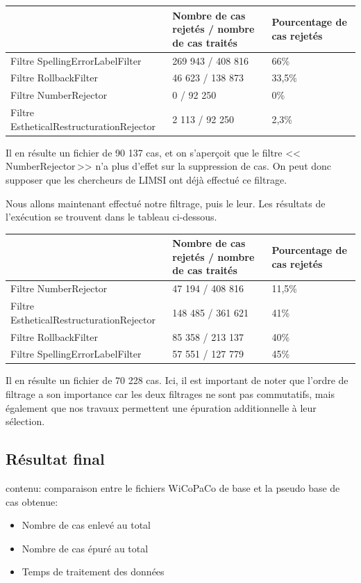 \documentclass[11pt]{article}
\begin{document}
\begin{center}
\begin{tabular}{|M{6cm}|M{5cm}|M{6cm}|}
   \hline
    \, &Nombre de cas rejet\'{e}s / nombre de cas trait\'{e}s & Pourcentage de cas rejet\'{e}s \tabularnewline
    \hline
    Filtre SpellingErrorLabelFilter & 269 943 / 408 816 & 66\% \tabularnewline
   \hline
       Filtre RollbackFilter & 46 623 / 138 873 & 33,5\% \tabularnewline
 \hline
    Filtre NumberRejector & 0 / 92 250 & 0\% \tabularnewline
\hline
Filtre EstheticalRestructurationRejector & 2 113 / 92 250 & 2,3\% \tabularnewline
\hline
\end{tabular}
\end{center}

Il en r\'{e}sulte un fichier de 90 137 cas, et on s'aper\c{c}oit que le filtre <<\,NumberRejector\,>> n'a plus d'effet sur la suppression de cas. On peut donc supposer que les chercheurs de LIMSI ont d\'{e}j\`{a} effectu\'{e} ce filtrage.

Nous allons maintenant effectu\'{e} notre filtrage, puis le leur.
Les r\'{e}sultats de l'ex\'{e}cution se trouvent dans le tableau ci-dessous.

\begin{center}
\begin{tabular}{|M{6cm}|M{5cm}|M{6cm}|}
   \hline
    \, &Nombre de cas rejet\'{e}s / nombre de cas trait\'{e}s & Pourcentage de cas rejet\'{e}s \tabularnewline
    \hline
     Filtre NumberRejector & 47 194 / 408 816 & 11,5\% \tabularnewline
\hline
Filtre EstheticalRestructurationRejector & 148 485 / 361 621 & 41\% \tabularnewline
\hline
Filtre RollbackFilter & 85 358 / 213 137 & 40\% \tabularnewline
 \hline
    Filtre SpellingErrorLabelFilter & 57 551 / 127 779 & 45\% \tabularnewline
   \hline
   \end{tabular}
\end{center}
Il en r\'{e}sulte un fichier de 70 228 cas.
\newline
Ici, il est important de noter que l'ordre de filtrage a son importance car les deux filtrages ne sont pas commutatifs, mais \'{e}galement que nos travaux permettent une \'{e}puration additionnelle \`{a} leur s\'{e}lection.


\subsection{R\'{e}sultat final}
contenu:
comparaison entre le fichiers WiCoPaCo de base et la pseudo base de cas obtenue:
\begin{itemize}
\item Nombre de cas enlev\'{e} au total
\item Nombre de cas \'{e}pur\'{e} au total
\item Temps de traitement des donn\'{e}es
\end{itemize}
\end{document}
